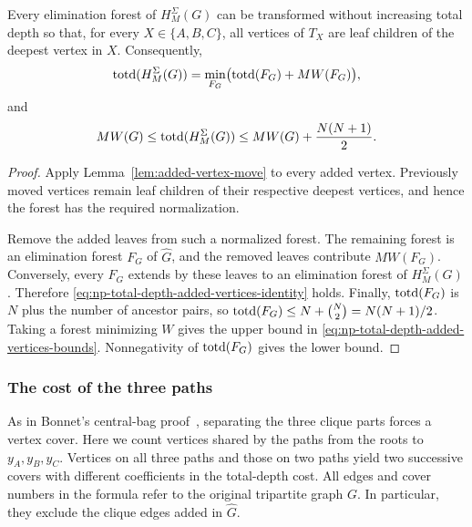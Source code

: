 \begin{lemma}
\label{lem:np-total-depth-added-vertices}
Every elimination forest of $H^{\Sigma}_M(G)$ can be transformed without
increasing total depth so that, for every $X\in\{A,B,C\}$, all
vertices of $T_X$ are leaf children of the deepest vertex in $X$.
Consequently,
\begin{equation}\label{eq:np-total-depth-added-vertices-identity}
 \operatorname{totd}(H^{\Sigma}_M(G))=\min_{F_G}\bigl(\operatorname{totd}(F_G)+MW(F_G)\bigr),
\end{equation}
and
\begin{equation}\label{eq:np-total-depth-added-vertices-bounds}
 MW(G)\le \operatorname{totd}(H^{\Sigma}_M(G))\le MW(G)+\frac{N(N+1)}2.
\end{equation}
\end{lemma}


\begin{proof}
Apply Lemma~\ref{lem:added-vertex-move} to every added vertex.
Previously moved vertices remain leaf children of their respective
deepest vertices, and hence the forest has the required normalization.

Remove the added leaves from such a normalized forest. The remaining
forest is an elimination forest $F_G$ of
$\widehat G$, and the removed leaves contribute $MW(F_G)$.
Conversely, every $F_G$ extends by these leaves to an elimination
forest of $H^{\Sigma}_M(G)$. Therefore
\eqref{eq:np-total-depth-added-vertices-identity} holds. Finally,
$\operatorname{totd}(F_G)$ is $N$ plus the number of ancestor pairs, so
$\operatorname{totd}(F_G)\le N+\binom N2=N(N+1)/2$. Taking a forest minimizing
$W$ gives the upper bound in
\eqref{eq:np-total-depth-added-vertices-bounds}. Nonnegativity of $\operatorname{totd}(F_G)$ gives
the lower bound.
\end{proof}

\subsubsection{The cost of the three paths}

As in Bonnet's central-bag proof~\cite[proof of Lemma~6]{BonnetTreewidth},
separating the three clique parts forces a vertex cover. Here we
count vertices shared by the paths from the roots to $y_A,y_B,y_C$.
Vertices on all three paths and those on two paths yield two
successive covers with different coefficients in the total-depth cost.
All edges and cover numbers in the formula refer to the original
tripartite graph $G$. In particular, they exclude the clique edges
added in $\widehat G$.

